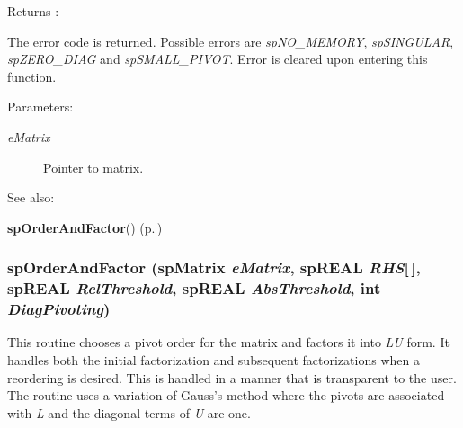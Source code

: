 \begin{Desc}
\item[Returns :]\par
 The error code is returned. Possible errors are {\em sp\-NO\_\-MEMORY}, {\em sp\-SINGULAR}, {\em sp\-ZERO\_\-DIAG} and {\em sp\-SMALL\_\-PIVOT}. Error is cleared upon entering this function.\end{Desc}
\begin{Desc}
\item[Parameters: ]\par
\begin{description}
\item[{\em 
e\-Matrix}]Pointer to matrix. \end{description}
\end{Desc}
\begin{Desc}
\item[See also: ]\par
{\bf sp\-Order\-And\-Factor}() {\rm (p.\,\pageref{spFactor_8c_a24})} \end{Desc}
\subsubsection{ sp\-Order\-And\-Factor ({\bf sp\-Matrix} {\em e\-Matrix}, sp\-REAL {\em RHS}[$\,$], sp\-REAL {\em Rel\-Threshold}, sp\-REAL {\em Abs\-Threshold}, int {\em Diag\-Pivoting})}\label{spFactor_8c_a24}


This routine chooses a pivot order for the matrix and factors it into {\em LU} form. It handles both the initial factorization and subsequent factorizations when a reordering is desired. This is handled in a manner that is transparent to the user. The routine uses a variation of Gauss's method where the pivots are associated with {\em L} and the diagonal terms of {\em U} are one.


